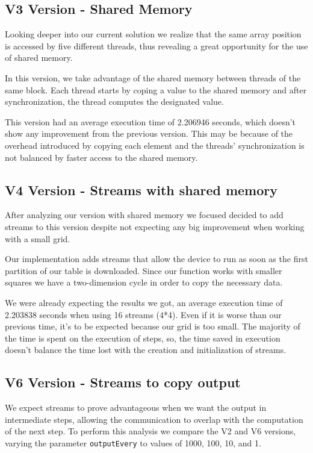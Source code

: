 \documentclass[conference]{IEEEtran}
\begin{document}


\subsection{V3 Version - Shared Memory}
Looking deeper into our current solution we realize that the same array position is accessed by five different threads, thus revealing a great opportunity for the use of shared memory.

In this version, we take advantage of the shared memory between threads of the same block. Each thread starts by coping a value to the shared memory and after synchronization, the thread computes the designated value.

This version had an average execution time of 2.206946 seconds, which doesn't show any improvement from the previous version. This may be because of the overhead introduced by copying each element and the threads' synchronization is not balanced by faster access to the shared memory.

\subsection{V4 Version - Streams with shared memory}
After analyzing our version with shared memory we focused decided to add streams to this version despite not expecting any big improvement when working with a small grid.

Our implementation adds streams that allow the device to run as soon as the first partition of our table is downloaded. Since our function works with smaller squares we have a two-dimension cycle in order to copy the necessary data.

We were already expecting the results we got, an average execution time of 2.203838 seconds when using 16 streams (4*4). Even if it is worse than our previous time, it's to be expected because our grid is too small. The majority of the time is spent on the execution of steps, so, the time saved in execution doesn't balance the time lost with the creation and initialization of streams.




\subsection{V6 Version - Streams to copy output}
We expect streams to prove advantageous when we want the output in intermediate steps, allowing the communication to overlap with the computation of the next step. To perform this analysis we compare the V2 and V6 versions, varying the parameter \texttt{outputEvery} to values of 1000, 100, 10, and 1.
\end{document}
